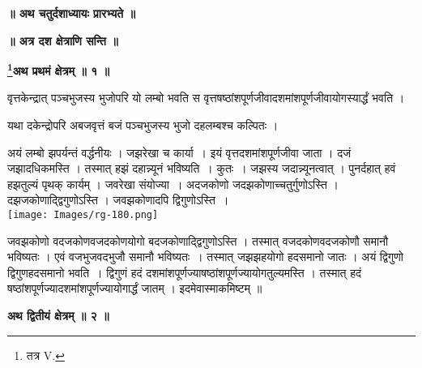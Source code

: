 \documentclass[11pt, openany]{book}
\begin{document}
\newpage
{}
\afterpage{\fancyhead[LE,RO]{\thepage}}
\cfoot{}
\newpage
\newpage
\thispagestyle{empty}
\begin{center}
\textbf{\LARGE ॥ अथ चतुर्दशाध्यायः प्रारभ्यते ॥}
\end{center}
\vspace{3mm}

\begin{center}
\textbf{॥ अत्र दश क्षेत्राणि सन्ति ॥}
\vspace{5mm}

\textbf{\large \renewcommand{\thefootnote}{१}\footnote{तत्र {\en V.}}अथ प्रथमं क्षेत्रम् ॥ १ ॥ }
\end{center}
\vspace{2mm}

{\ab वृत्तकेन्द्रात् पञ्चभुजस्य भुजोपरि यो लम्बो भवति स वृत्तषष्ठांशपूर्णजीवादशमांशपूर्णजीवायोगस्यार्द्धं भवति । }\\
\vspace{3mm}

यथा दकेन्द्रोपरि अबजवृत्तं बजं पञ्चभुजस्य भुजो दहलम्बश्च कल्पितः ।
\begin{vwcol}[widths={0.7,0.3}, sep=.8cm, rule=0pt]
अयं लम्बो झपर्यन्तं वर्द्धनीयः । जझरेखा च कार्या~। इयं वृत्तदशमांशपूर्णजीवा जाता । दजं जझादधिकमस्ति । तस्मात् हझं दहान्न्यूनं भविष्यति~। कुतः~। जझस्य
जदान्न्यूनत्वात् । पुनर्दहात् हवं हझतुल्यं पृथक् कार्यम् । जवरेखा संयोज्या~। अदजकोणो जदझकोणाच्चतुर्गुणोऽस्ति । दझजकोणाद्द्विगुणोऽस्ति । जवझकोणादपि द्विगुणोऽस्ति~। \\
\noindent \texttt{[image: Images/rg-180.png]}  
\end{vwcol}
\vspace{-3mm}

\noindent जवझकोणो वदजकोणवजदकोणयोगो बदजकोणाद्द्विगुणोऽस्ति । तस्मात् वजदकोणवदजकोणौ समानौ भविष्यतः । एवं वजभुजवदभुजौ समानौ भविष्यतः~। तस्मात् जझझहयोगो हदसमानो जातः । अयं द्विगुणो द्विगुणहदसमानो भवति~। द्विगुणं हदं दशमांशपूर्णज्याषष्ठांशपूर्णज्यायोगतुल्यमस्ति । तस्मात् हदं षष्ठांशपूर्णज्यादशमांशपूर्णज्यायोगार्द्धं जातम् । इदमेवास्माकमिष्टम् ॥\\
\vspace{3mm}

\begin{center}
\textbf{\large अथ द्वितीयं क्षेत्रम् ॥ २ ॥ }
\end{center}
\vspace{5mm}
\end{document}

